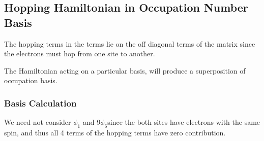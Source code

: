 \documentclass{article}
\begin{document}
\subsection{Hopping Hamiltonian in Occupation Number Basis}
  The hopping terms in the terms lie on the off diagonal terms of the matrix since the electrons must hop from one site to
  another.

  The Hamiltonian acting on a particular basis, will produce a superposition of occupation basis.
  \subsubsection{Basis Calculation}
  We need not consider \( \phi_1 \) and 9\( \phi_6\)since the both sites have electrons with the same spin, and
  thus all 4 terms of the hopping terms have zero contribution.
\end{document}
